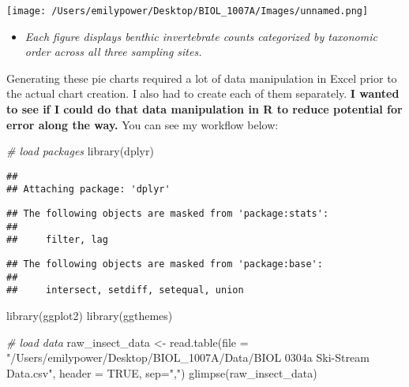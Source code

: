 \documentclass[
]{article}
\newenvironment{Shaded}{\begin{snugshade}}{\end{snugshade}}
\newcommand{\AttributeTok}[1]{\textcolor[rgb]{0.77,0.63,0.00}{#1}}
\newcommand{\CommentTok}[1]{\textcolor[rgb]{0.56,0.35,0.01}{\textit{#1}}}
\newcommand{\ConstantTok}[1]{\textcolor[rgb]{0.00,0.00,0.00}{#1}}
\newcommand{\FunctionTok}[1]{\textcolor[rgb]{0.00,0.00,0.00}{#1}}
\newcommand{\NormalTok}[1]{#1}
\newcommand{\OtherTok}[1]{\textcolor[rgb]{0.56,0.35,0.01}{#1}}
\newcommand{\StringTok}[1]{\textcolor[rgb]{0.31,0.60,0.02}{#1}}
\providecommand{\tightlist}{%
  \setlength{\itemsep}{0pt}\setlength{\parskip}{0pt}}
\begin{document}
\texttt{[image: /Users/emilypower/Desktop/BIOL\_1007A/Images/unnamed.png]}

\begin{itemize}
\tightlist
\item
  \emph{Each figure displays benthic invertebrate counts categorized by
  taxonomic order across all three sampling sites.}
\end{itemize}

Generating these pie charts required a lot of data manipulation in Excel
prior to the actual chart creation. I also had to create each of them
separately. \textbf{I wanted to see if I could do that data manipulation
in R to reduce potential for error along the way.} You can see my
workflow below:

\begin{Shaded}
\begin{Highlighting}[]
\CommentTok{\# load packages}
\FunctionTok{library}\NormalTok{(dplyr)}
\end{Highlighting}
\end{Shaded}

\begin{verbatim}
## 
## Attaching package: 'dplyr'
\end{verbatim}

\begin{verbatim}
## The following objects are masked from 'package:stats':
## 
##     filter, lag
\end{verbatim}

\begin{verbatim}
## The following objects are masked from 'package:base':
## 
##     intersect, setdiff, setequal, union
\end{verbatim}

\begin{Shaded}
\begin{Highlighting}[]
\FunctionTok{library}\NormalTok{(ggplot2)}
\FunctionTok{library}\NormalTok{(ggthemes)}

\CommentTok{\# load data}
\NormalTok{raw\_insect\_data }\OtherTok{\textless{}{-}} \FunctionTok{read.table}\NormalTok{(}\AttributeTok{file =} \StringTok{"/Users/emilypower/Desktop/BIOL\_1007A/Data/BIOL 0304a Ski{-}Stream Data.csv"}\NormalTok{, }\AttributeTok{header =} \ConstantTok{TRUE}\NormalTok{, }\AttributeTok{sep=}\StringTok{","}\NormalTok{)}
\FunctionTok{glimpse}\NormalTok{(raw\_insect\_data)}
\end{Highlighting}
\end{Shaded}
\end{document}
